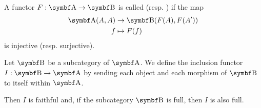 \begin{definition}\label{def:faithful_full_functor}\cite[definition 1.2.16]{Leinster2014}
  A functor \( F: \Bold A \to \Bold B \) is called  (resp. ) if the map
  \begin{align*}
    \Cat{A}(A, A) &\to \Bold{B}(F(A), F(A')) \\
    f &\mapsto F(f)
  \end{align*}
  is injective (resp. surjective).
\end{definition}

\begin{example}\label{def:subcategory_functors}\cite[25]{Leinster2014}
  Let \( \Bold B \) be a subcategory of \( \Bold A \). We define the inclusion functor \( I: \Bold B \to \Bold A \) by sending each object and each morphism of \( \Bold B \) to itself within \( \Bold A \).

  Then \( I \) is faithful and, if the subcategory \( \Bold B \) is full, then \( I \) is also full.
\end{example}

